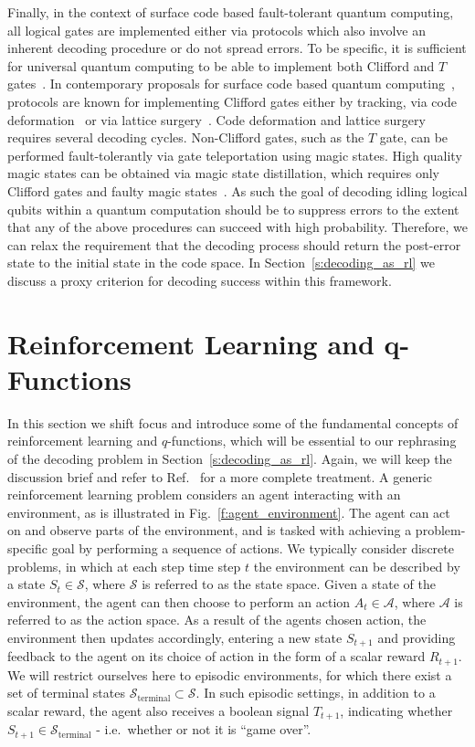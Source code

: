 \documentclass[twocolumn,preprintnumbers,amsmath,amssymb,notitlepage,nofootinbib,longbibliography,superscriptaddress,aps,pra,10pt]{revtex4-1}
\begin{document}
	Finally, in the context of surface code based fault-tolerant quantum computing, all logical gates are implemented either via protocols which also involve an inherent decoding procedure or do not spread errors.
	To be specific, it is sufficient for universal quantum computing to be able to implement both Clifford and $T$ gates~\cite{Nebe01,Bravyi05}.
	In contemporary proposals for surface code based quantum computing~\cite{Litinski18b,Fowler18}, 
	protocols are known for implementing Clifford gates either by tracking, via code deformation~\cite{Brown17} or via lattice 
	surgery~\cite{Horsman12,Litinski18}.
	Code deformation and lattice surgery requires several decoding cycles.
	Non-Clifford gates, such as the $T$ gate, can be performed fault-tolerantly via gate teleportation using magic states.
	High quality magic states can be obtained via magic state distillation, which requires only Clifford gates and faulty magic states~\cite{Bravyi05}.
	As such the goal of decoding idling logical qubits within a quantum computation should be to suppress errors to the extent that any of the above procedures can succeed with high probability.
	Therefore, we can relax the requirement that the decoding process should return the post-error state to the initial state in the code space.
	In Section~\ref{s:decoding_as_rl} we discuss a proxy criterion for decoding success within this framework.

\section{Reinforcement Learning and q-Functions}\label{s:reinforcement_learning}

	In this section we shift focus and introduce some of the fundamental concepts of reinforcement learning and $q$-functions, which will be essential to our rephrasing of the decoding problem in Section~\ref{s:decoding_as_rl}.
	Again, we will keep the discussion brief and refer to Ref.~\cite{RLSutton18} for a more complete treatment.
	A generic reinforcement learning problem considers an agent interacting with an environment, as is illustrated in Fig.~\ref{f:agent_environment}.
	The agent can act on and observe parts of the environment, and is tasked with achieving a problem-specific goal by performing a sequence of actions.
	We typically consider discrete problems, in  which at each step time step $t$ the environment can be described by a state $S_t \in \mathcal{S}$, where $\mathcal{S}$ is referred to as the state space.
	Given a state of the environment, the agent can then choose to perform an action $A_t \in \mathcal{A}$, where $\mathcal{A}$ is referred to as the action space.
	As a result of the agents chosen action, the environment then updates accordingly, entering a new state $S_{t+1}$ and providing feedback to the agent on its choice of action in the form of a scalar reward $R_{t+1}$.
	We will restrict ourselves here to episodic environments, for which there exist a set of terminal states $\mathcal{S}_{\mathrm{terminal}} \subset \mathcal{S}$.
	In such episodic settings, in addition to a scalar reward, the agent also receives a boolean signal $T_{t+1}$, indicating whether $S_{t+1} \in \mathcal{S}_{\mathrm{terminal}} $ - i.e.\ whether or not it is ``game over''.
\end{document}
